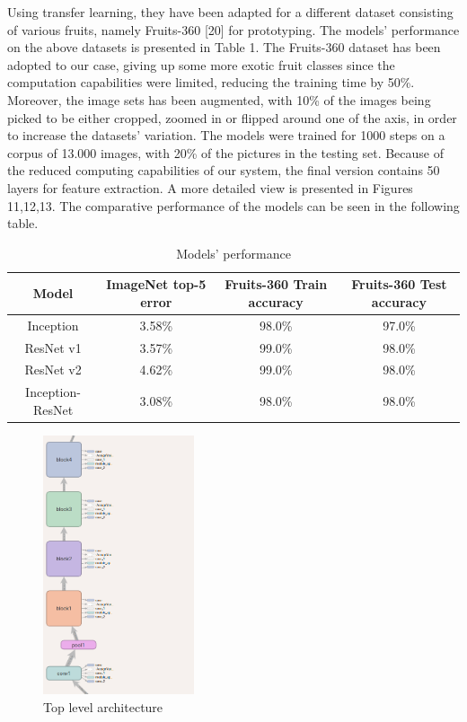 \documentclass[a4paper,11pt]{article}
\begin{document}
	  Using transfer learning, they have been
	  adapted for a different dataset consisting of various
	  fruits, namely Fruits-360 [20] for prototyping. The
	  models’ performance on the above datasets is presented
	  in Table 1. The Fruits-360 dataset has been adopted to
	  our case, giving up some more exotic fruit classes since
	  the computation capabilities were limited, reducing the
	  training time by 50\%. Moreover, the image sets has
	  been augmented, with 10\% of the images being picked
	  to be either cropped, zoomed in or flipped around one
	  of the axis, in order to increase the datasets’ variation.
	  The models were trained for 1000 steps on a corpus of
	  13.000 images, with 20\% of the pictures in the testing
	  set. Because of the reduced computing capabilities of our system, the final version contains 50 layers for feature extraction. A more detailed view is presented in Figures 11,12,13. The comparative performance of the models can be seen in the following table.

\begin{table}[!h]
	\centering
	\begin{tabular}{ |c|c|c|c| } 
		\hline
		Model & ImageNet top-5 error & Fruits-360 Train accuracy & Fruits-360 Test accuracy \\
		\hline 
		Inception & 3.58\% & 98.0\% & 97.0\%\\ 
		ResNet v1 & 3.57\% & 99.0\% & 98.0\% \\ 
		ResNet v2 & 4.62\% & 99.0\% & 98.0\% \\ 
		Inception- ResNet & 3.08\% & 98.0\% & 98.0\%\\
		\hline
	\end{tabular}
	\newline
	\caption{Models' performance}
\end{table}
	
	\begin{figure}[H]
		\includegraphics[height=3in]{modelabove.png}
		\caption{Top level architecture}
	\end{figure}
	
\end{document}
